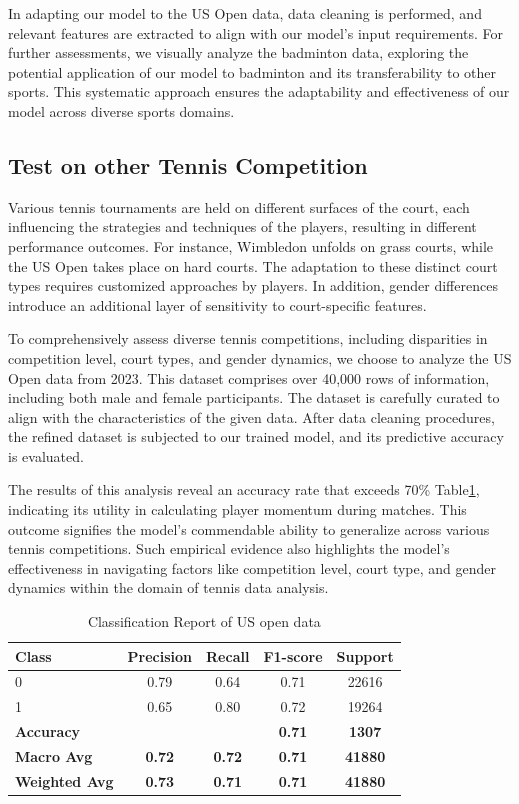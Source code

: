 \documentclass{mcmthesis}
\begin{document}
In adapting our model to the US Open data, data cleaning is performed, and relevant features are extracted to align with our model's input requirements. For further assessments, we visually analyze the badminton data, exploring the potential application of our model to badminton and its transferability to other sports. This systematic approach ensures the adaptability and effectiveness of our model across diverse sports domains.

\subsection{Test on other Tennis Competition}
Various tennis tournaments are held on different surfaces of the court, each influencing the strategies and techniques of the players, resulting in different performance outcomes. For instance, Wimbledon unfolds on grass courts, while the US Open takes place on hard courts. The adaptation to these distinct court types requires customized approaches by players. In addition, gender differences introduce an additional layer of sensitivity to court-specific features.

To comprehensively assess diverse tennis competitions, including disparities in competition level, court types, and gender dynamics, we choose to analyze the US Open data from 2023. This dataset comprises over 40,000 rows of information, including both male and female participants. The dataset is carefully curated to align with the characteristics of the given data. After data cleaning procedures, the refined dataset is subjected to our trained model, and its predictive accuracy is evaluated.

The results of this analysis reveal an accuracy rate that exceeds 70\% Table\ref{tab:usopen_report}, indicating its utility in calculating player momentum during matches. This outcome signifies the model's commendable ability to generalize across various tennis competitions. Such empirical evidence also highlights the model's effectiveness in navigating factors like competition level, court type, and gender dynamics within the domain of tennis data analysis.

\begin{table}[ht]
\centering
\caption{Classification Report of US open data}
\label{tab:usopen_report}
\begin{tabular}{lcccc}
\toprule
Class & Precision & Recall & F1-score & Support \\
\midrule
0 & 0.79 & 0.64 & 0.71 & 22616 \\
1 & 0.65 & 0.80 & 0.72 & 19264 \\
\midrule
\textbf{Accuracy} & & & \textbf{0.71} & \textbf{1307} \\
\textbf{Macro Avg} & \textbf{0.72} & \textbf{0.72} & \textbf{0.71} & \textbf{41880} \\
\textbf{Weighted Avg} & \textbf{0.73} & \textbf{0.71} & \textbf{0.71} & \textbf{41880} \\
\bottomrule
\end{tabular}
\end{table}
\end{document}
